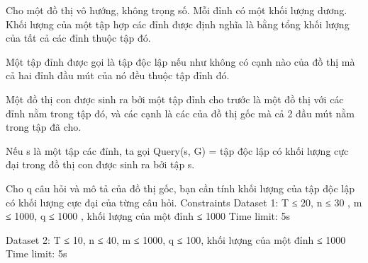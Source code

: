 Cho một đồ thị vô hướng, không trọng số. Mỗi đỉnh có một khối lượng dương. Khối lượng của một tập hợp các đỉnh được định nghĩa là bằng tổng khối lượng của tất cả các đỉnh thuộc tập đó.  

   Một tập đỉnh được gọi là tập độc lập nếu như không có cạnh nào của đồ thị mà cả hai đỉnh đầu mút của nó đều thuộc tập đỉnh đó.  

   Một đồ thị con được sinh ra bởi một tập đỉnh cho trước là một đồ thị với các đỉnh nằm trong tập đó, và các cạnh là các của đồ thị gốc mà cả 2 đầu mút nằm trong tập đã cho.  

   Nếu s là một tập các đỉnh, ta gọi Query(s, G) = tập độc lập có khối lượng cực đại trong đồ thị con được sinh ra bởi tập s.  

   Cho q câu hỏi và mô tả của đồ thị gốc, bạn cần tính khối lượng của tập độc lập có khối lượng cực đại của từng câu hỏi.
Constraints
Dataset 1: T ≤ 20, n ≤ 30 , m ≤ 1000, q ≤ 1000 , khối lượng của một đỉnh ≤ 1000 Time limit: 5s  

   Dataset 2: T ≤ 10, n ≤ 40, m ≤ 1000, q ≤ 100, khối lượng của một đỉnh ≤ 1000 Time limit: 5s